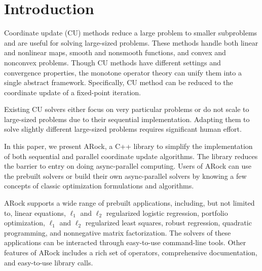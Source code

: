 \section{Introduction}
Coordinate update (CU) methods reduce a large problem to smaller subproblems and are useful for solving large-sized problems.
These methods handle both linear and nonlinear maps, smooth and nonsmooth functions, and convex and nonconvex problems. 
Though CU methods have different settings and convergence properties,  the monotone operator theory can unify them into a single abstract framework. 
Specifically, CU method can be reduced to the coordinate update of a fixed-point iteration. 

Existing CU solvers \cite{?,?,?,?,?} either focus on very particular problems or do not scale to large-sized problems due to their sequential implementation. 
Adapting them to solve slightly different large-sized problems requires significant human effort. 

In this paper, we present ARock, a C++ library to simplify the implementation of both sequential and parallel coordinate update algorithms. 
The library reduces the barrier to entry on doing async-parallel computing. Users of ARock can use the prebuilt solvers or build their own async-parallel solvers by knowing a few concepts of classic optimization formulations and algorithms.

ARock supports a wide range of prebuilt applications, including, but not limited to, 
linear equations, $\ell_1$ and $\ell_2$ regularized logistic regression, portfolio optimization, $\ell_1$ and $\ell_2$ regularized least squares, robust regression, quadratic programming, and nonnegative matrix factorization. 
The solvers of these applications can be interacted through easy-to-use command-line tools. 
Other features of ARock includes a rich set of operators, comprehensive documentation, and easy-to-use library calls.